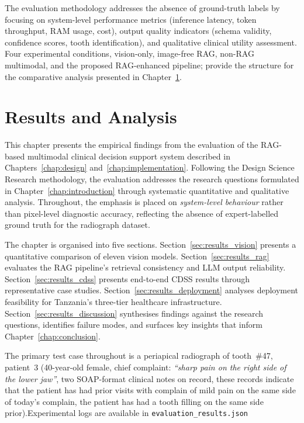 \documentclass[12pt,a4paper]{report}
\begin{document}
The evaluation methodology addresses the absence of ground-truth labels
by focusing on system-level performance metrics (inference latency,
token throughput, RAM usage, cost), output quality indicators (schema
validity, confidence scores, tooth identification), and qualitative
clinical utility assessment.  Four experimental conditions, vision-only,
image-free RAG, non-RAG multimodal, and the proposed RAG-enhanced
pipeline; provide the structure for the comparative analysis presented
in Chapter~\ref{chap:results}.



\chapter{Results and Analysis}
\label{chap:results}

This chapter presents the empirical findings from the evaluation of the RAG-based multimodal clinical decision support system described in
Chapters~\ref{chap:design} and~\ref{chap:implementation}. Following the Design
Science Research methodology, the evaluation addresses the research questions
formulated in Chapter~\ref{chap:introduction} through systematic quantitative
and qualitative analysis. Throughout, the emphasis is placed on
\emph{system-level behaviour} rather than pixel-level diagnostic accuracy,
reflecting the absence of expert-labelled ground truth for the radiograph
dataset.

The chapter is organised into five sections. Section~\ref{sec:results_vision}
presents a quantitative comparison of eleven vision models. Section~\ref{sec:results_rag}
evaluates the RAG pipeline's retrieval consistency and LLM output reliability.
Section~\ref{sec:results_cdss} presents end-to-end CDSS results through
representative case studies. Section~\ref{sec:results_deployment} analyses
deployment feasibility for Tanzania's three-tier healthcare infrastructure.
Section~\ref{sec:results_discussion} synthesises findings against the research
questions, identifies failure modes, and surfaces key insights that inform
Chapter~\ref{chap:conclusion}.

The primary test case throughout is a periapical radiograph of tooth~\#47,
patient~3 (40-year-old female, chief complaint: \textit{``sharp pain on the right
side of the lower jaw''}, two SOAP-format clinical notes on record, these records indicate that the patient has had prior visits with complain of mild pain on the same side of today's complain, the patient has had a tooth filling on the same side prior).Experimental logs are available in \texttt{evaluation\_results.json}
\end{document}
